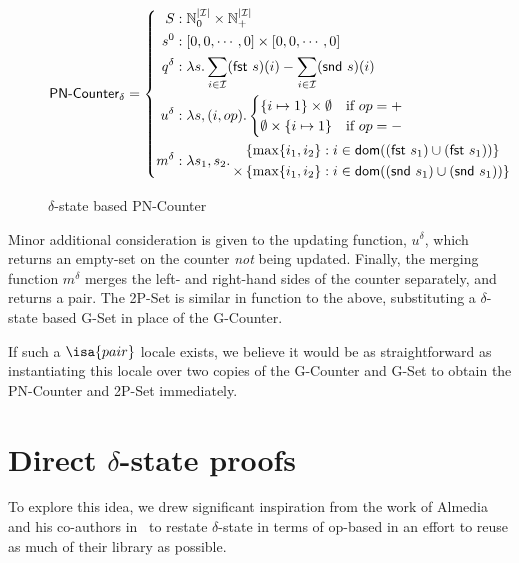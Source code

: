 \begin{figure}[H]
  \[
    \textsf{PN-Counter}_\delta = \left\{\begin{aligned}
      S &: \mathbb{N}_0^{|\mathcal{I}|} \times \mathbb{N}_+^{|\mathcal{I}|} \\
      s^0 &: \left[ 0, 0, \cdots, 0 \right] \times \left[ 0, 0, \cdots, 0 \right] \\
      q^\delta &: \lambda s. \sum_{i \in \mathcal{I}} (\textsf{fst}~s)(i) - \sum_{i \in
        \mathcal{I}} (\textsf{snd}~s)(i) \\
      u^\delta &: \lambda s,(i,op). \begin{cases}
             \{ i \mapsto 1 \} \times \emptyset & \text{if $op=+$} \\
             \emptyset \times \{ i \mapsto 1 \} & \text{if $op=-$} \\
           \end{cases} \\
      m^\delta &: \lambda s_1, s_2.\, \begin{aligned}
             &\left\{ \max\{ i_1, i_2 \} : i \in \mathsf{dom}((\textsf{fst}~s_1) \cup (\textsf{fst}~s_1)) \right\} \\
             \times &\left\{ \max\{ i_1, i_2 \} : i \in \mathsf{dom}((\textsf{snd}~s_1) \cup (\textsf{snd}~s_1)) \right\}
           \end{aligned}
    \end{aligned}\right.
  \]
  \caption{$\delta$-state based \textsf{PN-Counter} \CRDT}
\end{figure}

Minor additional consideration is given to the updating function,
$u^\delta$, which returns an empty-set on the counter \emph{not} being updated.
Finally, the merging function $m^\delta$ merges the left- and right-hand sides
of the counter separately, and returns a pair. The 2P-Set is similar in function
to the above, substituting a $\delta$-state based G-Set in place of the
G-Counter.

If such a $\isa{pair}$ locale exists, we believe it would be as straightforward
as instantiating this locale over two copies of the G-Counter and G-Set to
obtain the PN-Counter and 2P-Set immediately.

\section{Direct $\delta$-state \CRDT proofs}
\label{sec:direct-delta-proofs}

To explore this idea, we drew significant inspiration from the work of Almedia
and his co-authors in~\citet{almedia18} to restate $\delta$-state \CRDTs in
terms of op-based \CRDTs in an effort to reuse as much of their library as
possible.

